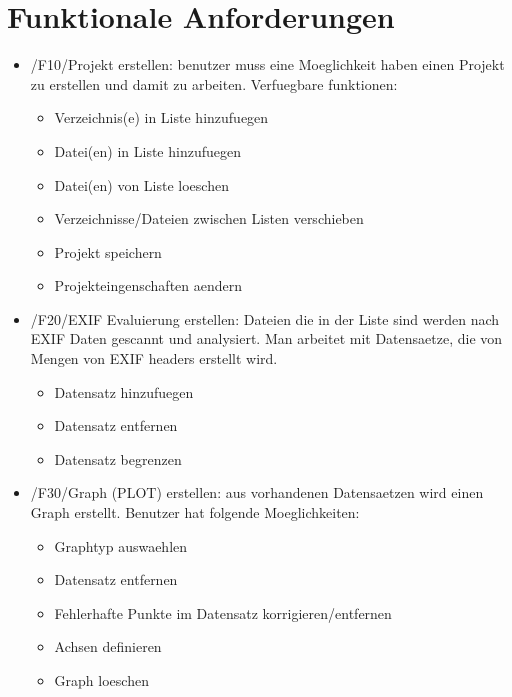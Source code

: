 \section{Funktionale Anforderungen}
\begin{itemize}
\item /F10/Projekt erstellen: benutzer muss eine Moeglichkeit haben einen Projekt zu erstellen und damit zu arbeiten. Verfuegbare funktionen:\\
	\begin{itemize}
		\item Verzeichnis(e) in Liste hinzufuegen\\
		\item Datei(en) in Liste hinzufuegen\\
		\item Datei(en) von Liste loeschen\\
		\item Verzeichnisse/Dateien zwischen Listen verschieben\\
		\item Projekt speichern\\
		\item Projekteingenschaften aendern\\
	\end{itemize}

\item /F20/EXIF Evaluierung erstellen: Dateien die in der Liste sind werden nach EXIF Daten gescannt und analysiert. Man arbeitet mit Datensaetze, die von Mengen von EXIF headers erstellt wird. \\
	\begin{itemize}
		\item Datensatz hinzufuegen\\
		\item Datensatz entfernen\\
		\item Datensatz begrenzen\\
	\end{itemize}

\item /F30/Graph (PLOT) erstellen: aus vorhandenen Datensaetzen wird einen Graph erstellt. Benutzer hat folgende Moeglichkeiten:
	\begin{itemize}
		\item Graphtyp auswaehlen\\
		\item Datensatz entfernen\\
		\item Fehlerhafte Punkte im Datensatz korrigieren/entfernen\\
		\item Achsen definieren\\
		\item Graph loeschen\\
	\end{itemize}
	

\end{itemize}

